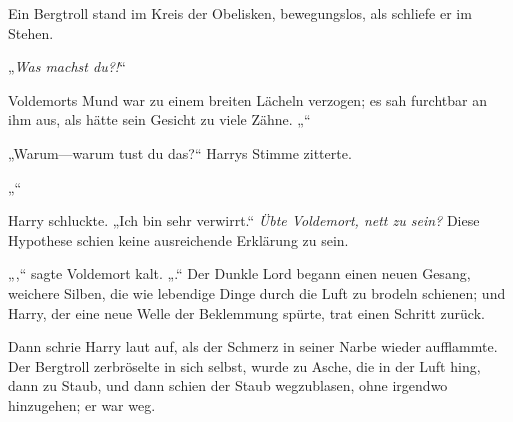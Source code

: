 Ein Bergtroll stand im Kreis der Obelisken, bewegungslos, als schliefe er im Stehen.

„\emph{Was machst du?!}“

Voldemorts Mund war zu einem breiten Lächeln verzogen; es sah furchtbar an ihm aus, als hätte sein Gesicht zu viele Zähne.
„“

„Warum—warum tust du das?“ Harrys Stimme zitterte.

„“

Harry schluckte. „Ich bin sehr verwirrt.“
\emph{Übte Voldemort, nett zu sein?} Diese Hypothese schien keine ausreichende Erklärung zu sein.

„,“ sagte Voldemort kalt. „.“
Der Dunkle Lord begann einen neuen Gesang, weichere Silben, die wie lebendige Dinge durch die Luft zu brodeln schienen; und Harry, der eine neue Welle der Beklemmung spürte, trat einen Schritt zurück.

Dann schrie Harry laut auf, als der Schmerz in seiner Narbe wieder aufflammte. Der Bergtroll zerbröselte in sich selbst, wurde zu Asche, die in der Luft hing, dann zu Staub, und dann schien der Staub wegzublasen, ohne irgendwo hinzugehen; er war weg.

